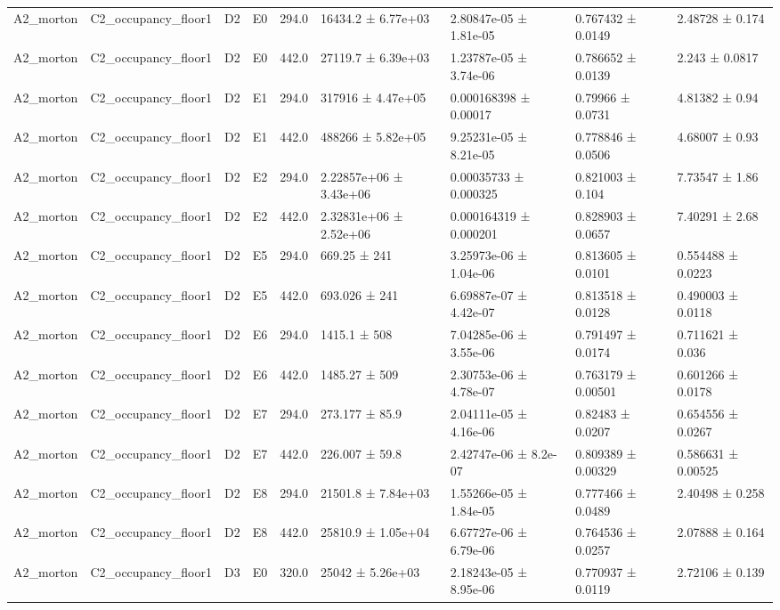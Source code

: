 \begin{table}
\begin{tabular}{lllllllll}
A2\_morton & C2\_occupancy\_floor1 & D2 & E0 & 294.0 & 16434.2 ± 6.77e+03 & 2.80847e-05 ± 1.81e-05 & 0.767432 ± 0.0149 & 2.48728 ± 0.174 \\
A2\_morton & C2\_occupancy\_floor1 & D2 & E0 & 442.0 & 27119.7 ± 6.39e+03 & 1.23787e-05 ± 3.74e-06 & 0.786652 ± 0.0139 & 2.243 ± 0.0817 \\
A2\_morton & C2\_occupancy\_floor1 & D2 & E1 & 294.0 & 317916 ± 4.47e+05 & 0.000168398 ± 0.00017 & 0.79966 ± 0.0731 & 4.81382 ± 0.94 \\
A2\_morton & C2\_occupancy\_floor1 & D2 & E1 & 442.0 & 488266 ± 5.82e+05 & 9.25231e-05 ± 8.21e-05 & 0.778846 ± 0.0506 & 4.68007 ± 0.93 \\
A2\_morton & C2\_occupancy\_floor1 & D2 & E2 & 294.0 & 2.22857e+06 ± 3.43e+06 & 0.00035733 ± 0.000325 & 0.821003 ± 0.104 & 7.73547 ± 1.86 \\
A2\_morton & C2\_occupancy\_floor1 & D2 & E2 & 442.0 & 2.32831e+06 ± 2.52e+06 & 0.000164319 ± 0.000201 & 0.828903 ± 0.0657 & 7.40291 ± 2.68 \\
A2\_morton & C2\_occupancy\_floor1 & D2 & E5 & 294.0 & 669.25 ± 241 & 3.25973e-06 ± 1.04e-06 & 0.813605 ± 0.0101 & 0.554488 ± 0.0223 \\
A2\_morton & C2\_occupancy\_floor1 & D2 & E5 & 442.0 & 693.026 ± 241 & 6.69887e-07 ± 4.42e-07 & 0.813518 ± 0.0128 & 0.490003 ± 0.0118 \\
A2\_morton & C2\_occupancy\_floor1 & D2 & E6 & 294.0 & 1415.1 ± 508 & 7.04285e-06 ± 3.55e-06 & 0.791497 ± 0.0174 & 0.711621 ± 0.036 \\
A2\_morton & C2\_occupancy\_floor1 & D2 & E6 & 442.0 & 1485.27 ± 509 & 2.30753e-06 ± 4.78e-07 & 0.763179 ± 0.00501 & 0.601266 ± 0.0178 \\
A2\_morton & C2\_occupancy\_floor1 & D2 & E7 & 294.0 & 273.177 ± 85.9 & 2.04111e-05 ± 4.16e-06 & 0.82483 ± 0.0207 & 0.654556 ± 0.0267 \\
A2\_morton & C2\_occupancy\_floor1 & D2 & E7 & 442.0 & 226.007 ± 59.8 & 2.42747e-06 ± 8.2e-07 & 0.809389 ± 0.00329 & 0.586631 ± 0.00525 \\
A2\_morton & C2\_occupancy\_floor1 & D2 & E8 & 294.0 & 21501.8 ± 7.84e+03 & 1.55266e-05 ± 1.84e-05 & 0.777466 ± 0.0489 & 2.40498 ± 0.258 \\
A2\_morton & C2\_occupancy\_floor1 & D2 & E8 & 442.0 & 25810.9 ± 1.05e+04 & 6.67727e-06 ± 6.79e-06 & 0.764536 ± 0.0257 & 2.07888 ± 0.164 \\
A2\_morton & C2\_occupancy\_floor1 & D3 & E0 & 320.0 & 25042 ± 5.26e+03 & 2.18243e-05 ± 8.95e-06 & 0.770937 ± 0.0119 & 2.72106 ± 0.139 \\

\end{tabular}
\end{table}
